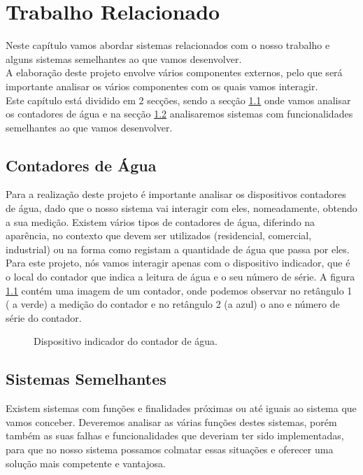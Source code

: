 %
%
\chapter{Trabalho Relacionado} \label{cap:trabrelacionado}
Neste capítulo vamos abordar sistemas relacionados com o nosso trabalho e alguns sistemas semelhantes ao que vamos desenvolver.\\
A elaboração deste projeto envolve vários componentes externos, pelo que será importante analisar os vários componentes com os quais vamos interagir.\\
Este capítulo está dividido em 2 secções, sendo a secção \ref{sec:cont} onde vamos analisar os contadores de água e na secção \ref{sec:semelhantes} analisaremos sistemas com funcionalidades semelhantes ao que vamos desenvolver.

\section{Contadores de Água} \label{sec:cont}
Para a realização deste projeto é importante analisar os dispositivos contadores de água, dado que o nosso sistema vai interagir com eles, nomeadamente, obtendo a sua medição.
Existem vários tipos de contadores de água, diferindo na aparência, no contexto que devem ser utilizados (residencial, comercial, industrial) ou na forma como registam a quantidade de água que passa por eles. Para este projeto, nós vamos interagir apenas com o dispositivo indicador, que é o local do contador que indica a leitura de água e o seu número de série.
A figura \ref{fig:contador} contém uma imagem de um contador, onde podemos observar no retângulo 1 ( a verde) a medição do contador e no retângulo 2 (a azul) o ano e número de série do contador.

\begin{figure}[h!]
\begin{center}
\caption{Dispositivo indicador do contador de água.}
\label{fig:contador}
\end{center}
\end{figure}

\section{Sistemas Semelhantes} \label{sec:semelhantes}
Existem sistemas com funções e finalidades próximas ou até iguais ao sistema que vamos conceber. Deveremos analisar as várias funções destes sistemas, porém também as suas falhas e funcionalidades que deveriam ter sido implementadas, para que no nosso sistema possamos colmatar essas situações e oferecer uma solução mais competente e vantajosa.

